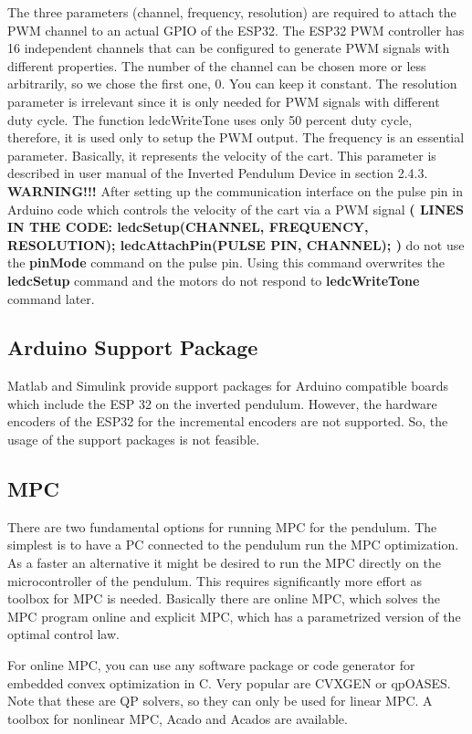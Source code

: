 \documentclass{article}
\begin{document}
The three parameters (channel, frequency, resolution) are required to attach the PWM channel to an actual GPIO of the ESP32. The ESP32 PWM controller has 16 independent channels that can be configured to generate PWM signals with different properties. The number of the channel can be chosen more or less arbitrarily, so we chose the first one, 0. You can keep it constant. The resolution parameter is irrelevant since it is only needed for PWM signals with different duty cycle. The function ledcWriteTone uses only 50 percent duty cycle, therefore, it is used only to setup the PWM output. The frequency is an essential parameter. Basically, it represents the velocity of the cart. This parameter is described in user manual of the Inverted Pendulum Device in section 2.4.3. \textbf{WARNING!!!} After setting up the communication interface on the pulse pin in Arduino code which controls the velocity of the cart via a PWM signal \textbf{( LINES IN THE CODE: ledcSetup(CHANNEL, FREQUENCY, RESOLUTION); ledcAttachPin(PULSE PIN, CHANNEL); )} do not use the \textbf{pinMode} command on the pulse pin. Using this command overwrites the \textbf{ledcSetup} command and the motors do not respond to \textbf{ledcWriteTone} command later.

\subsection{Arduino Support Package} 
Matlab and Simulink provide support packages for Arduino compatible boards which include the ESP 32 on the inverted pendulum. However, the hardware encoders of the ESP32 for the incremental encoders are not supported. So, the usage of the support packages is not feasible.

\subsection{MPC}
There are two fundamental options for running MPC for the pendulum. The simplest is to have a PC connected to the pendulum run the MPC optimization. As a faster an alternative it might be desired to run the MPC directly on the microcontroller of the pendulum. This requires significantly more effort as toolbox for MPC is needed. Basically there are online MPC, which solves the MPC program online and explicit MPC, which has a parametrized version of the optimal control law. 

For online MPC, you can use any software package or code generator for embedded convex optimization in C. Very popular are CVXGEN or qpOASES. Note that these are QP solvers, so they can only be used for linear MPC. A toolbox for nonlinear MPC, Acado and Acados are available.
\end{document}
